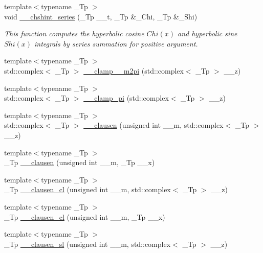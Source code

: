 \begin{DoxyCompactItemize}
{\footnotesize template$<$typename \+\_\+\+Tp $>$ }\\void \hyperlink{namespacestd_1_1____detail_a16055b6e4baa35ffe5c6d9495d9d0158}{\+\_\+\+\_\+chshint\+\_\+series} (\+\_\+\+Tp \+\_\+\+\_\+t, \+\_\+\+Tp \&\+\_\+\+Chi, \+\_\+\+Tp \&\+\_\+\+Shi)
\begin{DoxyCompactList}\small\item\em This function computes the hyperbolic cosine $ Chi(x) $ and hyperbolic sine $ Shi(x) $ integrals by series summation for positive argument. \end{DoxyCompactList}\item 
{\footnotesize template$<$typename \+\_\+\+Tp $>$ }\\std\+::complex$<$ \+\_\+\+Tp $>$ \hyperlink{namespacestd_1_1____detail_a4b52c9c0f24edd3c61c771f55f20002b}{\+\_\+\+\_\+clamp\+\_\+\_\+m2pi} (std\+::complex$<$ \+\_\+\+Tp $>$ \+\_\+\+\_\+z)
\item 
{\footnotesize template$<$typename \+\_\+\+Tp $>$ }\\std\+::complex$<$ \+\_\+\+Tp $>$ \hyperlink{namespacestd_1_1____detail_aa341299d514aa754403a775b9ed51c91}{\+\_\+\+\_\+clamp\+\_\+pi} (std\+::complex$<$ \+\_\+\+Tp $>$ \+\_\+\+\_\+z)
\item 
{\footnotesize template$<$typename \+\_\+\+Tp $>$ }\\std\+::complex$<$ \+\_\+\+Tp $>$ \hyperlink{namespacestd_1_1____detail_a8f7e931e2a93b8d298a4df702a5e41ad}{\+\_\+\+\_\+clausen} (unsigned int \+\_\+\+\_\+m, std\+::complex$<$ \+\_\+\+Tp $>$ \+\_\+\+\_\+z)
\item 
{\footnotesize template$<$typename \+\_\+\+Tp $>$ }\\\+\_\+\+Tp \hyperlink{namespacestd_1_1____detail_a07d0f6b515fec03e423e5cecbb7580cd}{\+\_\+\+\_\+clausen} (unsigned int \+\_\+\+\_\+m, \+\_\+\+Tp \+\_\+\+\_\+x)
\item 
{\footnotesize template$<$typename \+\_\+\+Tp $>$ }\\\+\_\+\+Tp \hyperlink{namespacestd_1_1____detail_ab09b3cb1a96ba96e7fddadd0ea717b1c}{\+\_\+\+\_\+clausen\+\_\+cl} (unsigned int \+\_\+\+\_\+m, std\+::complex$<$ \+\_\+\+Tp $>$ \+\_\+\+\_\+z)
\item 
{\footnotesize template$<$typename \+\_\+\+Tp $>$ }\\\+\_\+\+Tp \hyperlink{namespacestd_1_1____detail_a523b5171a620d8816339c71994e67bb1}{\+\_\+\+\_\+clausen\+\_\+cl} (unsigned int \+\_\+\+\_\+m, \+\_\+\+Tp \+\_\+\+\_\+x)
\item 
{\footnotesize template$<$typename \+\_\+\+Tp $>$ }\\\+\_\+\+Tp \hyperlink{namespacestd_1_1____detail_ab7d250f236ef63ed8bd260881b73524d}{\+\_\+\+\_\+clausen\+\_\+sl} (unsigned int \+\_\+\+\_\+m, std\+::complex$<$ \+\_\+\+Tp $>$ \+\_\+\+\_\+z)

\end{DoxyCompactItemize}
